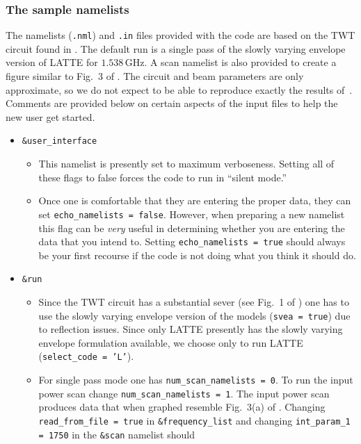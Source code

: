 \documentclass{article}
\begin{document}
\subsubsection{The sample namelists}\label{ss:sample_namelists}
The namelists ({\tt *.nml}) and {\tt *.in} files provided with the code
are based on the TWT circuit found in \cite{abe:clhtwtc00}.
The default run is a single pass of the slowly varying envelope version
of LATTE for $1.538\,$GHz. A scan namelist is also provided to create
a figure similar to Fig.~3 of \cite{abe:clhtwtc00}.
The circuit and beam parameters are only approximate, so we do
not expect to be able to reproduce exactly the results of~\cite{abe:clhtwtc00}.
Comments are provided below on certain aspects of the input files to
help the new user get started.

\begin{itemize}
\item {\tt \&user\_interface}
  \begin{itemize}
  \item This namelist is presently set to maximum verboseness. Setting all of
    these flags to false forces the code to run in ``silent mode.''
  \item Once one is comfortable that they are entering the proper data,
    they can set {\tt echo\_namelists = false}. However, when preparing
    a new namelist this flag can be {\em very} useful in determining whether
    you are entering the data that you intend to. Setting
    {\tt echo\_namelists = true} should always be your
    first recourse if the code is not doing what you think it should do.
  \end{itemize}
\item {\tt \&run}
  \begin{itemize}
  \item Since the TWT circuit has a substantial sever (see
    Fig.~1 of \cite{abe:clhtwtc00}) one has to use the slowly varying envelope
    version of the models ({\tt svea = true}) due to reflection issues.
    Since only LATTE presently
    has the slowly varying envelope formulation available, we choose only to
    run LATTE ({\tt select\_code = 'L'}).
  \item For single pass mode one has {\tt num\_scan\_namelists = 0}. To run
    the input power scan change {\tt num\_scan\_namelists = 1}. The input
    power scan produces data that when graphed resemble Fig.~3(a)
    of \cite{abe:clhtwtc00}.
    Changing {\tt read\_from\_file = true} in {\tt \&frequency\_list} and
    changing
    {\tt int\_param\_1 = 1750} in the {\tt \&scan} namelist should

\end{itemize}
\end{itemize}
\end{document}
